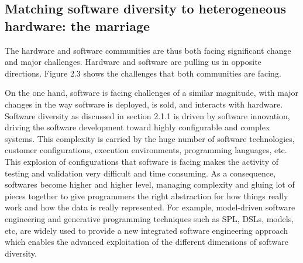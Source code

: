 
\subsection{Matching software diversity to heterogeneous hardware: the marriage}

The hardware and software communities are thus both facing significant change and major challenges. Hardware and software are pulling us in opposite directions. Figure 2.3 shows the challenges that both communities are facing.  

On the one hand, software is facing challenges of a similar magnitude, with major changes in the way software is deployed, is sold, and interacts with hardware. 
Software diversity as discussed in section 2.1.1 is driven by software innovation, driving the software development toward highly configurable and complex systems. This complexity is carried by the huge number of software technologies, customer configurations, execution environments, programming languages, etc. This explosion of configurations that software is facing makes the activity of testing and validation very difficult and time consuming. 
As a consequence, softwares become higher and higher level, managing complexity and gluing lot of pieces together to give programmers the right abstraction for how things really work and how the data is really represented. 
For example, model-driven software engineering and generative programming techniques such as SPL, DSLs, models, etc, are widely used to provide a new integrated software engineering approach which enables the advanced exploitation of the different dimensions of software diversity.

